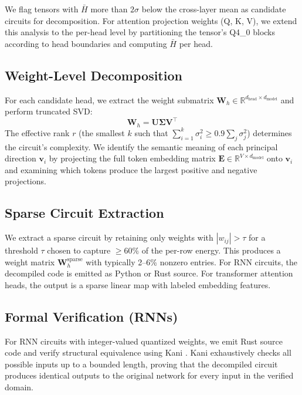 \documentclass[11pt]{article}
\begin{document}
We flag tensors with $\bar{H}$ more than $2\sigma$ below the cross-layer mean as candidate circuits for decomposition. For attention projection weights (Q, K, V), we extend this analysis to the per-head level by partitioning the tensor's Q4\_0 blocks according to head boundaries and computing $\bar{H}$ per head.

\subsection{Weight-Level Decomposition}

For each candidate head, we extract the weight submatrix $\mathbf{W}_h \in \mathbb{R}^{d_\text{head} \times d_\text{model}}$ and perform truncated SVD:
\begin{equation}
  \mathbf{W}_h = \mathbf{U} \mathbf{\Sigma} \mathbf{V}^\top
\end{equation}
The effective rank $r$ (the smallest $k$ such that $\sum_{i=1}^{k} \sigma_i^2 \geq 0.9 \sum_j \sigma_j^2$) determines the circuit's complexity. We identify the semantic meaning of each principal direction $\mathbf{v}_i$ by projecting the full token embedding matrix $\mathbf{E} \in \mathbb{R}^{V \times d_\text{model}}$ onto $\mathbf{v}_i$ and examining which tokens produce the largest positive and negative projections.

\subsection{Sparse Circuit Extraction}

We extract a sparse circuit by retaining only weights with $|w_{ij}| > \tau$ for a threshold $\tau$ chosen to capture $\geq 60\%$ of the per-row energy. This produces a weight matrix $\mathbf{W}_h^\text{sparse}$ with typically 2--6\% nonzero entries. For RNN circuits, the decompiled code is emitted as Python or Rust source. For transformer attention heads, the output is a sparse linear map with labeled embedding features.

\subsection{Formal Verification (RNNs)}

For RNN circuits with integer-valued quantized weights, we emit Rust source code and verify structural equivalence using Kani \cite{kani}. Kani exhaustively checks all possible inputs up to a bounded length, proving that the decompiled circuit produces identical outputs to the original network for every input in the verified domain.
\end{document}
